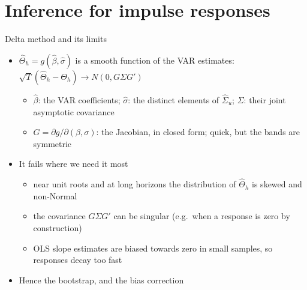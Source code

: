 \section{Inference for impulse responses}

\begin{frame}{Delta method and its limits}
\itemsize{\small}
\begin{itemize}
    \item $\hat\Theta_h = g(\hat\beta, \hat\sigma)$ is a smooth function of the VAR estimates: $\sqrt T(\hat\Theta_h - \Theta_h) \to N(0, G\Sigma G')$ 
    \begin{itemize}
        \item $\hat\beta$: the VAR coefficients; $\hat\sigma$: the distinct elements of $\hat\Sigma_u$; $\Sigma$: their joint asymptotic covariance
        \item $G = \partial g/\partial(\beta, \sigma)$: the Jacobian, in closed form; quick, but the bands are symmetric
    \end{itemize}
    \item It fails where we need it most
    \begin{itemize}
        \item near unit roots and at long horizons the distribution of $\hat\Theta_h$ is skewed and non-Normal
        \item the covariance $G\Sigma G'$ can be singular (e.g.\ when a response is zero by construction)
        \item OLS slope estimates are biased towards zero in small samples, so responses decay too fast
    \end{itemize}
    \item Hence the bootstrap, and the bias correction
\end{itemize}
\end{frame}

